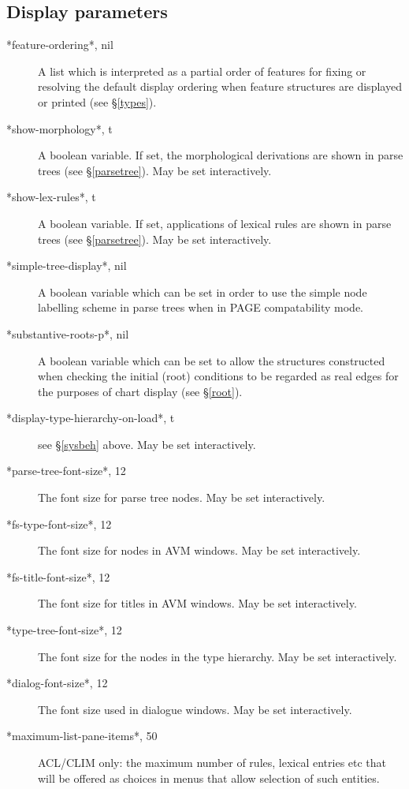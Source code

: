 \documentclass[12pt]{report}
\begin{document}
\subsection{Display parameters}
\label{disglob}
\begin{description}
\item[*feature-ordering*, nil]
A list which is interpreted as 
a partial order of features for fixing or resolving the default 
display ordering when feature structures are displayed or printed
(see \S\ref{types}).
\item[ *show-morphology*, t]
A boolean variable.  If set, the morphological 
derivations are shown in parse trees (see \S\ref{parsetree}).
May be set interactively.
\item[ *show-lex-rules*, t]
A boolean variable. If set, 
applications of lexical rules are shown in parse trees (see \S\ref{parsetree}).
May be set interactively.
\item[ *simple-tree-display*, nil ]
A boolean variable which can be set in order 
to use the simple node labelling scheme
in parse trees when in PAGE compatability mode.
\item[ *substantive-roots-p*, nil]
A boolean variable which can
be set to allow the structures constructed when checking the
initial (root) conditions
to be regarded as real edges
for the purposes of chart display (see \S\ref{root}).
\item[*display-type-hierarchy-on-load*, t] see \S\ref{sysbeh} above.
May be set interactively.
\item[ *parse-tree-font-size*, 12] The font size for parse tree nodes.
May be set interactively.
\item[ *fs-type-font-size*, 12] The font size for nodes in AVM windows.
May be set interactively.
\item[ *fs-title-font-size*, 12] The font size for titles in AVM windows.
May be set interactively.
\item[ *type-tree-font-size*, 12] The font size for the nodes in the type hierarchy.
May be set interactively.
\item[ *dialog-font-size*, 12] The font size used in dialogue windows.
May be set interactively.
\item[ *maximum-list-pane-items*, 50] ACL/CLIM only: the maximum number
of rules, lexical entries etc that will be offered as choices in menus that
allow selection of such entities.  
\end{description}
\end{document}
